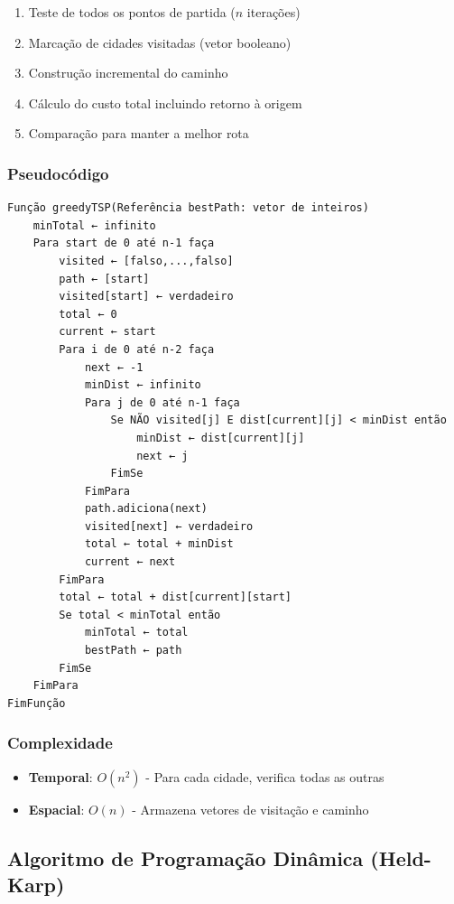 \begin{enumerate}
\item Teste de todos os pontos de partida ($n$ iterações)
\item Marcação de cidades visitadas (vetor booleano)
\item Construção incremental do caminho
\item Cálculo do custo total incluindo retorno à origem
\item Comparação para manter a melhor rota
\end{enumerate}

\subsubsection{Pseudocódigo}
\begin{verbatim}
Função greedyTSP(Referência bestPath: vetor de inteiros)
    minTotal ← infinito
    Para start de 0 até n-1 faça
        visited ← [falso,...,falso]
        path ← [start]
        visited[start] ← verdadeiro
        total ← 0
        current ← start
        Para i de 0 até n-2 faça
            next ← -1
            minDist ← infinito
            Para j de 0 até n-1 faça
                Se NÃO visited[j] E dist[current][j] < minDist então
                    minDist ← dist[current][j]
                    next ← j
                FimSe
            FimPara
            path.adiciona(next)
            visited[next] ← verdadeiro
            total ← total + minDist
            current ← next
        FimPara
        total ← total + dist[current][start]
        Se total < minTotal então
            minTotal ← total
            bestPath ← path
        FimSe
    FimPara
FimFunção
\end{verbatim}

\subsubsection{Complexidade}
\begin{itemize}
\item \textbf{Temporal}: $O(n^2)$ - Para cada cidade, verifica todas as outras
\item \textbf{Espacial}: $O(n)$ - Armazena vetores de visitação e caminho
\end{itemize}

\subsection{Algoritmo de Programação Dinâmica (Held-Karp)}

